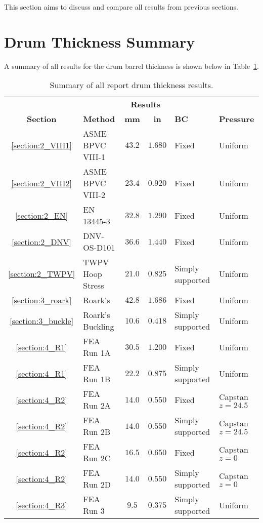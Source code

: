 
This section aims to discuss and compare all results from previous sections.

\section{Drum Thickness Summary}

A summary of all results for the drum barrel thickness is shown below in Table~\ref{table:5_sum}.

\begin{table}[H]
  \centering
  \caption{Summary of all report drum thickness results.}
    \begin{tabular}{clccll}
          &       & \multicolumn{2}{c}{\textbf{Results}} &       &  \\
    \textbf{Section} & \textbf{Method} & \textbf{mm} & \textbf{in} & \textbf{BC} & \textbf{Pressure } \\
    \midrule
          \ref{section:2_VIII1}& ASME BPVC VIII-1 & $43.2$ & $1.680$ & Fixed & Uniform \\
          \ref{section:2_VIII2}& ASME BPVC VIII-2 & $23.4$ & $0.920$ & Fixed & Uniform \\
          \ref{section:2_EN}& EN 13445-3 & $32.8$ & $1.290$ & Fixed & Uniform \\
          \ref{section:2_DNV}& DNV-OS-D101 & $36.6$ & $1.440$ & Fixed & Uniform \\
          \ref{section:2_TWPV}& TWPV Hoop Stress & $21.0$ & $0.825$ & Simply supported & Uniform \\
          \ref{section:3_roark}& Roark's & $42.8$ & $1.686$ & Fixed & Uniform \\
          \ref{section:3_buckle}& Roark's Buckling & $10.6$ & $0.418$ & Simply supported & Uniform \\
          \ref{section:4_R1}& FEA Run 1A & $30.5$ & $1.200$ & Fixed & Uniform \\
          \ref{section:4_R1}& FEA Run 1B & $22.2$ & $0.875$ & Simply supported & Uniform \\
          \ref{section:4_R2}& FEA Run 2A & $14.0$ & $0.550$ & Fixed & Capstan $z=24.5$ \\
          \ref{section:4_R2}& FEA Run 2B & $14.0$ & $0.550$ & Simply supported & Capstan $z=24.5$\\
          \ref{section:4_R2}& FEA Run 2C & $16.5$ & $0.650$ & Fixed & Capstan $z=0$ \\
          \ref{section:4_R2}& FEA Run 2D & $14.0$ & $0.550$ & Simply supported & Capstan $z=0$  \\
          \ref{section:4_R3}& FEA Run 3 & $9.5$ & $0.375$ & Simply supported & Uniform \\
    \end{tabular}
  \label{table:5_sum}
\end{table}%

